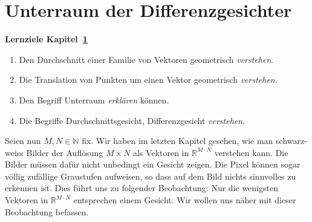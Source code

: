 \section{Unterraum der Differenzgesichter} \label{sec:facespace}
\begin{tcolorbox}
	\centerline{\textbf{Lernziele Kapitel~\ref{sec:facespace}}}
	\begin{enumerate}[leftmargin=*]
		\item Den Durchschnitt einer Familie von Vektoren geometrisch \textit{verstehen}.
		\item Die Translation von Punkten um einen Vektor geometrisch \textit{verstehen}.
		\item Den Begriff \glqq{}Unterraum\grqq{} \textit{erklären} können.
		\item Die Begriffe Durchschnittsgesicht, Differenzgesicht \textit{verstehen}.
	\end{enumerate}
\end{tcolorbox}
Seien nun $M,N\in\mathbb N$ fix.
Wir haben im letzten Kapitel gesehen, wie man schwarz-weiss Bilder der Auflösung $M\times N$ als Vektoren in $\mathbb R^{M\cdot N}$ verstehen kann.
Die Bilder müssen dafür nicht unbedingt ein Gesicht zeigen.
Die Pixel können sogar völlig zufällige Graustufen aufweisen, so dass auf dem Bild nichts sinnvolles zu erkennen ist.
Dies führt uns zu folgender Beobachtung:
Nur die wenigsten Vektoren in $\mathbb R^{M\cdot N}$ entsprechen einem Gesicht.
Wir wollen uns näher mit dieser Beobachtung befassen.

